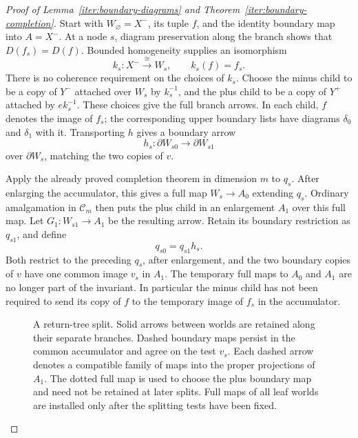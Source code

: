 \begin{proof}[Proof of Lemma~\ref{iter:boundary-diagrams} and
Theorem~\ref{iter:boundary-completion}]
Start with $W_\varnothing=X^-$, its tuple $f$, and the
identity boundary map into $A=X^-$. At a node $s$, diagram
preservation along the branch shows that
$D(f_s)=D(f)$. Bounded homogeneity supplies an isomorphism
\[
 k_s:X^-\overset{\cong}{\longrightarrow}W_s,
 \qquad k_s(f)=f_s.
\]
There is no coherence requirement on the choices of $k_s$.
Choose the minus child to be a copy of $Y^-$ attached over
$W_s$ by $k_s^{-1}$, and the plus child to be a copy of
$Y^+$ attached by $e k_s^{-1}$. These choices give the full
branch arrows. In each child, $f$ denotes the image of $f_s$;
the corresponding upper boundary lists have diagrams
$\delta_0$ and $\delta_1$ with it. Transporting $h$ gives
a boundary arrow
\[
 h_s:\partial W_{s0}\longrightarrow\partial W_{s1}
\]
over $\partial W_s$, matching the two copies of $v$.

Apply the already proved completion theorem in dimension $m$
to $q_s$. After enlarging the accumulator, this gives a full
map $W_s\to A_0$ extending $q_s$. Ordinary amalgamation in
$\mathcal C_m$ then puts the plus child in an enlargement
$A_1$ over this full map. Let $G_1:W_{s1}\to A_1$ be the
resulting arrow. Retain its boundary restriction as $q_{s1}$,
and define
\[
 q_{s0}=q_{s1}h_s.
\]
Both restrict to the preceding $q_s$, after enlargement, and
the two boundary copies of $v$ have one common image $v_s$
in $A_1$. The temporary full maps to $A_0$ and $A_1$ are
no longer part of the invariant. In particular the minus
child has not been required to send its copy of $f$ to the
temporary image of $f_s$ in the accumulator.

\begin{figure}[htbp]
\centering
{}
\caption{A return-tree split. Solid arrows between worlds are
retained along their separate branches. Dashed boundary maps
persist in the common accumulator and agree on the test $v_s$.
Each dashed arrow denotes a compatible family of maps into the
proper projections of $A_1$.
The dotted full map is used to choose the plus boundary map
and need not be retained at later splits. Full maps of all
leaf worlds are installed only after the splitting tests have
been fixed.}
\label{iter:fig-return-tree}
\end{figure}


\end{proof}

